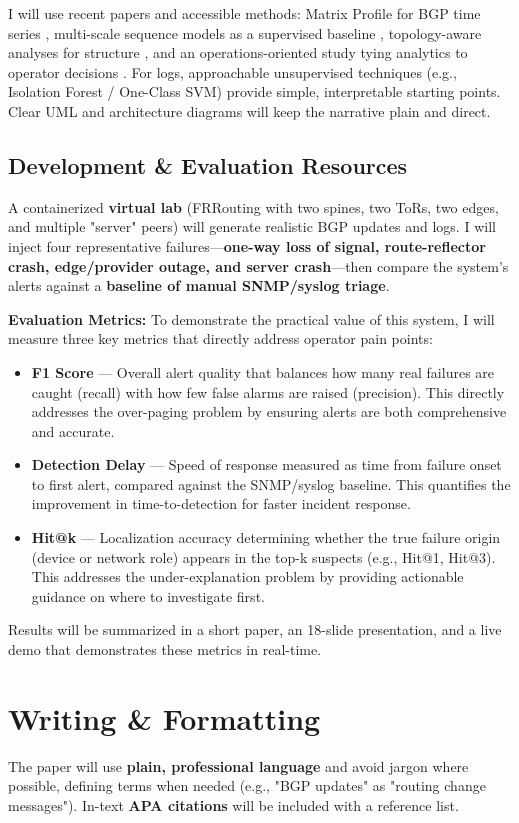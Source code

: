 \documentclass[11pt,letterpaper]{article}
\begin{document}
I will use recent papers and accessible methods: Matrix Profile for BGP time series \cite{scott2024}, multi-scale sequence models as a supervised baseline \cite{cheng2021}, topology-aware analyses for structure \cite{tan2024}, and an operations-oriented study tying analytics to operator decisions \cite{mohammed2021}. For logs, approachable unsupervised techniques (e.g., Isolation Forest / One-Class SVM) provide simple, interpretable starting points. Clear UML and architecture diagrams will keep the narrative plain and direct.

\subsection{Development \& Evaluation Resources}

A containerized \textbf{virtual lab} (FRRouting with two spines, two ToRs, two edges, and multiple "server" peers) will generate realistic BGP updates and logs. I will inject four representative failures—\textbf{one-way loss of signal, route-reflector crash, edge/provider outage, and server crash}—then compare the system's alerts against a \textbf{baseline of manual SNMP/syslog triage}. 

\textbf{Evaluation Metrics:} To demonstrate the practical value of this system, I will measure three key metrics that directly address operator pain points:

\begin{itemize}
    \item \textbf{F1 Score} — Overall alert quality that balances how many real failures are caught (recall) with how few false alarms are raised (precision). This directly addresses the over-paging problem by ensuring alerts are both comprehensive and accurate.
    
    \item \textbf{Detection Delay} — Speed of response measured as time from failure onset to first alert, compared against the SNMP/syslog baseline. This quantifies the improvement in time-to-detection for faster incident response.
    
    \item \textbf{Hit@k} — Localization accuracy determining whether the true failure origin (device or network role) appears in the top-k suspects (e.g., Hit@1, Hit@3). This addresses the under-explanation problem by providing actionable guidance on where to investigate first.
\end{itemize}

Results will be summarized in a short paper, an 18-slide presentation, and a live demo that demonstrates these metrics in real-time.

\section{Writing \& Formatting}

The paper will use \textbf{plain, professional language} and avoid jargon where possible, defining terms when needed (e.g., "BGP updates" as "routing change messages"). In-text \textbf{APA citations} will be included with a reference list.



\end{document}
